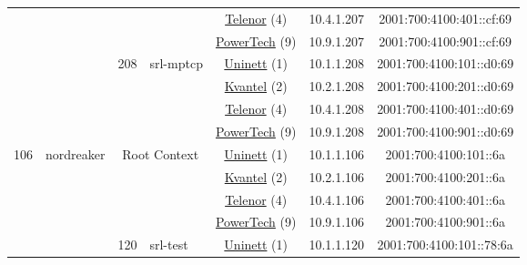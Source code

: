 \begin{small}
\begin{center}
\begin{longtable}{|c|c|c|c|c|c|c|c|}
  &  &  &  & \multicolumn{2}{|c|}{\tiny{\href{https://www.telenor.no}{Telenor} (4)}} & \tiny{10.4.1.207} & \tiny{2001:700:4100:401::cf:69} \\* \cline{5-5}\cline{6-6}\cline{7-7}\cline{8-8}
  &  &  &  & \multicolumn{2}{|c|}{\tiny{\href{http://www.powertech.no}{PowerTech} (9)}} & \tiny{10.9.1.207} & \tiny{2001:700:4100:901::cf:69} \\* \cline{3-3}\cline{4-4}\cline{5-5}\cline{6-6}\cline{7-7}\cline{8-8}
  &  & \multirow{4}{*}{\tiny{208}} & \multicolumn{1}{|l|}{\multirow{4}{*}{\tiny{srl-mptcp}}} & \multicolumn{2}{|c|}{\tiny{\href{https://www.uninett.no}{Uninett} (1)}} & \tiny{10.1.1.208} & \tiny{2001:700:4100:101::d0:69} \\* \cline{5-5}\cline{6-6}\cline{7-7}\cline{8-8}
  &  &  &  & \multicolumn{2}{|c|}{\tiny{\href{http://kvantel.no}{Kvantel} (2)}} & \tiny{10.2.1.208} & \tiny{2001:700:4100:201::d0:69} \\* \cline{5-5}\cline{6-6}\cline{7-7}\cline{8-8}
  &  &  &  & \multicolumn{2}{|c|}{\tiny{\href{https://www.telenor.no}{Telenor} (4)}} & \tiny{10.4.1.208} & \tiny{2001:700:4100:401::d0:69} \\* \cline{5-5}\cline{6-6}\cline{7-7}\cline{8-8}
  &  &  &  & \multicolumn{2}{|c|}{\tiny{\href{http://www.powertech.no}{PowerTech} (9)}} & \tiny{10.9.1.208} & \tiny{2001:700:4100:901::d0:69} \\ \hline
 \multirow{44}{*}{\tiny{106}} & \multicolumn{1}{|l|}{\multirow{44}{*}{\tiny{nordreaker}}} & \multicolumn{2}{|c|}{\multirow{4}{*}{\tiny{Root Context}}} & \multicolumn{2}{|c|}{\tiny{\href{https://www.uninett.no}{Uninett} (1)}} & \tiny{10.1.1.106} & \tiny{2001:700:4100:101::6a} \\* \cline{5-5}\cline{6-6}\cline{7-7}\cline{8-8}
  &  & \multicolumn{2}{|c|}{} & \multicolumn{2}{|c|}{\tiny{\href{http://kvantel.no}{Kvantel} (2)}} & \tiny{10.2.1.106} & \tiny{2001:700:4100:201::6a} \\* \cline{5-5}\cline{6-6}\cline{7-7}\cline{8-8}
  &  & \multicolumn{2}{|c|}{} & \multicolumn{2}{|c|}{\tiny{\href{https://www.telenor.no}{Telenor} (4)}} & \tiny{10.4.1.106} & \tiny{2001:700:4100:401::6a} \\* \cline{5-5}\cline{6-6}\cline{7-7}\cline{8-8}
  &  & \multicolumn{2}{|c|}{} & \multicolumn{2}{|c|}{\tiny{\href{http://www.powertech.no}{PowerTech} (9)}} & \tiny{10.9.1.106} & \tiny{2001:700:4100:901::6a} \\* \cline{3-3}\cline{4-4}\cline{5-5}\cline{6-6}\cline{7-7}\cline{8-8}
  &  & \multirow{4}{*}{\tiny{120}} & \multicolumn{1}{|l|}{\multirow{4}{*}{\tiny{srl-test}}} & \multicolumn{2}{|c|}{\tiny{\href{https://www.uninett.no}{Uninett} (1)}} & \tiny{10.1.1.120} & \tiny{2001:700:4100:101::78:6a} \\* \cline{5-5}\cline{6-6}\cline{7-7}\cline{8-8}

\end{longtable}
\end{center}
\end{small}
